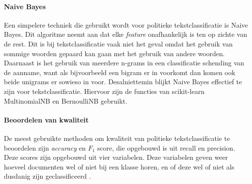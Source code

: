 \paragraph{Naive Bayes}
Een simpelere techniek die gebruikt wordt voor politieke tekstclassificatie is Naive Bayes. Dit algoritme neemt aan dat elke \textit{feature} onafhankelijk is ten op zichte van de rest. Dit is bij tekstclassificatie vaak niet het geval omdat het gebruik van sommige woorden gepaard kan gaan met het gebruik van andere woorden. Daarnaast is het gebruik van meerdere n-grams in een classificatie schending van de aanname, want als bijvoorbeeld een bigram er in voorkomt dan komen ook beide unigrams er sowieso in voor. Desalniettemin blijkt Naive Bayes effectief te zijn voor tekstclassificatie\cite{scikit-learn,bhand}. Hiervoor zijn de functies van scikit-learn MultinomialNB en BernoulliNB gebruikt.\cite{scikit-learn,bhand}\par

\paragraph{Beoordelen van kwaliteit}
De meest gebruikte methoden om kwaliteit van politieke tekstclassificatie te beoordelen zijn \textit{accuracy} en $F_1$ score, die opgebouwd is uit recall en precision. Deze scores zijn opgebouwd uit vier variabelen. Deze variabelen geven weer hoeveel documenten wel of niet bij een klasse horen, en of deze wel of niet als dusdanig zijn geclassificeerd \cite{Manning:2008:IIR:1394399} .\par


